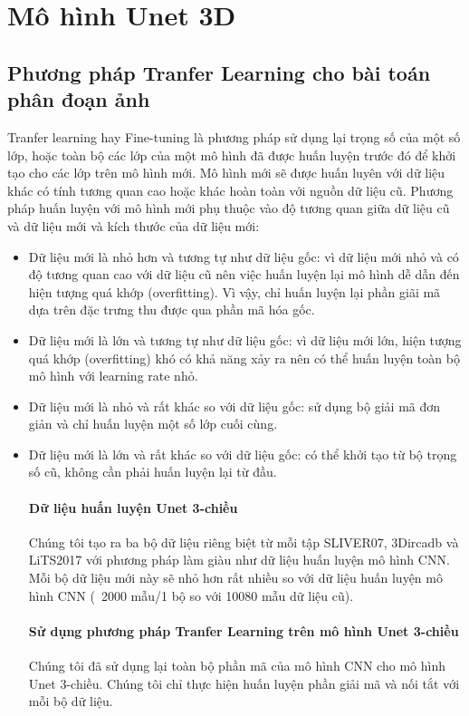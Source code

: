 \section{Mô hình Unet 3D}
\subsection{Phương pháp Tranfer Learning cho bài toán phân đoạn ảnh}
Tranfer learning hay Fine-tuning là phương pháp sử dụng lại trọng số của một số lớp, hoặc toàn bộ các lớp của một mô hình đã được huấn luyện trước đó để khởi tạo cho các lớp trên mô hình mới. Mô hình mới sẽ được huấn luyên với dữ liệu khác có tính tương quan cao hoặc khác hoàn toàn với nguồn dữ liệu cũ.
Phương pháp huấn luyện với mô hình mới phụ thuộc vào độ tương quan giữa dữ liệu cũ và dữ liệu mới và kích thước của dữ liệu mới:
\begin{itemize}
\item Dữ liệu mới là nhỏ hơn và tương tự như dữ liệu gốc: vì dữ liệu mới nhỏ và có độ tương quan cao với dữ liệu cũ nên việc huấn luyện lại mô hình dễ dẫn đến hiện tượng quá khớp (overfitting). Vì vậy, chỉ huấn luyện lại phần giãi mã dựa trên đặc trưng thu được qua phần mã hóa gốc.
\item Dữ liệu mới là lớn và tương tự như dữ liệu gốc: vì dữ liệu mới lớn, hiện tượng quá khớp (overfitting) khó có khả năng xảy ra nên có thể huấn luyện toàn bộ mô hình với learning rate nhỏ.
\item Dữ liệu mới là nhỏ và rất khác so với dữ liệu gốc: sử dụng bộ giải mã đơn giản và chỉ huấn luyện một số lớp cuối cùng.
\item Dữ liệu mới là lớn và rất khác so với dữ liệu gốc: có thể khởi tạo từ bộ trọng số cũ, không cần phải huấn luyện lại từ đầu.
\paragraph{Dữ liệu huấn luyện Unet 3-chiều} Chúng tôi tạo ra ba bộ dữ liệu riêng biệt từ mỗi tập SLIVER07, 3Dircadb và LiTS2017 với phương pháp làm giàu như dữ liệu huấn luyện mô hình CNN. Mỗi bộ dữ liệu mới này sẽ nhỏ hơn rất nhiều so với dữ liệu huấn luyện mô hình CNN (~2000 mẫu/1 bộ so với 10080 mẫu dữ liệu cũ).
\paragraph{Sử dụng phương pháp Tranfer Learning trên mô hình Unet 3-chiều} Chúng tôi đã sử dụng lại toàn bộ phần mã của mô hình CNN cho mô hình Unet 3-chiều. Chúng tôi chỉ thực hiện huấn luyện phần giải mã và nối tắt với mỗi bộ dữ liệu.
\end{itemize}
